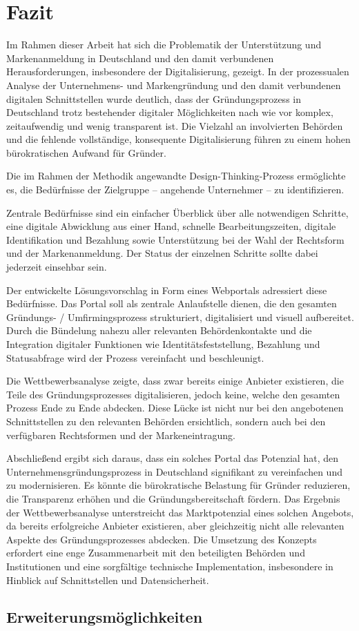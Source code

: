 \newpage

\section{Fazit} \label{fazit}

Im Rahmen dieser Arbeit hat sich die Problematik der Unterstützung und Markenanmeldung in Deutschland und den damit verbundenen Herausforderungen, insbesondere der Digitalisierung, gezeigt.
In der prozessualen Analyse der Unternehmens- und Markengründung und den damit verbundenen digitalen Schnittstellen wurde deutlich, dass der Gründungsprozess in Deutschland trotz bestehender digitaler Möglichkeiten nach wie vor komplex, zeitaufwendig und wenig transparent ist.
Die Vielzahl an involvierten Behörden und die fehlende vollständige, konsequente Digitalisierung führen zu einem hohen bürokratischen Aufwand für Gründer.

Die im Rahmen der Methodik angewandte Design-Thinking-Prozess ermöglichte es, die Bedürfnisse der Zielgruppe – angehende Unternehmer – zu identifizieren.

Zentrale Bedürfnisse sind ein einfacher Überblick über alle notwendigen Schritte, eine digitale Abwicklung aus einer Hand, schnelle Bearbeitungszeiten, digitale Identifikation und Bezahlung sowie Unterstützung bei der Wahl der Rechtsform und der Markenanmeldung.
Der Status der einzelnen Schritte sollte dabei jederzeit einsehbar sein.

Der entwickelte Lösungsvorschlag in Form eines Webportals adressiert diese Bedürfnisse. Das Portal soll als zentrale Anlaufstelle dienen, die den gesamten Gründungs- / Umfirmingsprozess strukturiert, digitalisiert und visuell aufbereitet.
Durch die Bündelung nahezu  aller relevanten Behördenkontakte und die Integration digitaler Funktionen wie Identitätsfeststellung, Bezahlung und Statusabfrage wird der Prozess vereinfacht und beschleunigt.

Die Wettbewerbsanalyse zeigte, dass zwar bereits einige Anbieter existieren, die Teile des Gründungsprozesses digitalisieren, jedoch keine, welche den gesamten Prozess Ende zu Ende abdecken.
Diese Lücke ist nicht nur bei den angebotenen Schnittstellen zu den relevanten Behörden ersichtlich, sondern auch bei den verfügbaren Rechtsformen und der Markeneintragung.

Abschließend ergibt sich daraus, dass ein solches Portal das Potenzial hat, den Unternehmensgründungsprozess in Deutschland signifikant zu vereinfachen und zu modernisieren.
Es könnte die bürokratische Belastung für Gründer reduzieren, die Transparenz erhöhen und die Gründungsbereitschaft fördern.
Das Ergebnis der Wettbewerbsanalyse unterstreicht das Marktpotenzial eines solchen Angebots, da bereits erfolgreiche Anbieter existieren, aber gleichzeitig nicht alle relevanten Aspekte des Gründungsprozesses abdecken.
Die Umsetzung des Konzepts erfordert eine enge Zusammenarbeit mit den beteiligten Behörden und Institutionen und eine sorgfältige technische Implementation, insbesondere in Hinblick auf Schnittstellen und Datensicherheit.

\subsection{Erweiterungsmöglichkeiten} \label{erweiterungsmoeglichkeiten}
